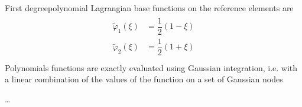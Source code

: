 \documentclass[letterpaper,10pt,english]{jupyterBook}
\begin{document}
\sphinxAtStartPar
First degree\sphinxhyphen{}polynomial Lagrangian base functions on the reference elements are
\begin{equation*}
\begin{split}\begin{aligned}
  \widetilde{\varphi}_1(\xi) & = \dfrac{1}{2} \left( 1 - \xi \right) \\
  \widetilde{\varphi}_2(\xi) & = \dfrac{1}{2} \left( 1 + \xi \right) \\
\end{aligned}\end{split}
\end{equation*}
\sphinxAtStartPar
{} Polynomials functions are exactly evaluated using Gaussian integration, i.e. with a linear combination of the values of the function on a set of Gaussian nodes 

\sphinxAtStartPar
…
\end{document}
